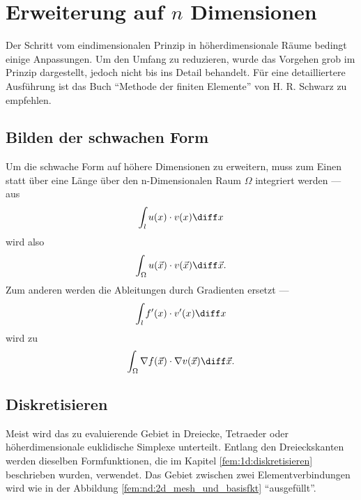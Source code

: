 %
%
%
%
\section{Erweiterung auf $n$ Dimensionen\label{fem:nD}}
Der Schritt vom eindimensionalen Prinzip in höherdimensionale Räume bedingt einige Anpassungen. 
Um den Umfang zu reduzieren, wurde das Vorgehen grob im Prinzip dargestellt, jedoch nicht bis ins Detail behandelt.
Für eine detailliertere Ausführung ist das Buch ``Methode der finiten Elemente'' \cite{fem:bib:methode_der_finiten_elemente} von H. R. Schwarz zu empfehlen.


\subsection{Bilden der schwachen Form}
Um die schwache Form auf höhere Dimensionen zu erweitern, muss zum Einen statt über eine Länge über den n-Dimensionalen Raum $\Omega$ integriert werden --- aus 
\begin{equation}
    \int_{l} u(x) \cdot v(x) \diff x
\end{equation}
wird also
\begin{equation}
    \int_{\Omega} u(\vec{x}) \cdot v(\vec{x}) \diff \vec{x}.
\end{equation}
Zum anderen werden die Ableitungen durch Gradienten ersetzt ---
\begin{equation}
    \int_{l} f'(x) \cdot v'(x) \diff x
\end{equation}
wird zu
\begin{equation}
    \int_{\Omega} \nabla f(\vec{x}) \cdot \nabla v(\vec{x}) \diff \vec{x}.
\end{equation}


\subsection{Diskretisieren}
Meist wird das zu evaluierende Gebiet in Dreiecke, Tetraeder oder höherdimensionale euklidische Simplexe unterteilt. 
Entlang den Dreieckskanten werden dieselben Formfunktionen, die im Kapitel \ref{fem:1d:diskretisieren} beschrieben wurden, verwendet.
Das Gebiet zwischen zwei Elementverbindungen wird wie in der Abbildung \ref{fem:nd:2d_mesh_und_basisfkt} ``ausgefüllt''.



